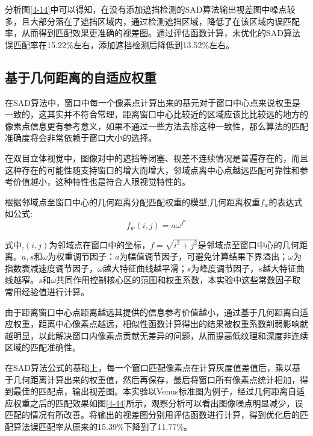 分析图\ref{4-14}中可以得知，在没有添加遮挡检测的SAD算法输出视差图中噪点较多，且大部分落在了遮挡区域内，通过检测遮挡区域，降低了在该区域内误匹配率，从而得到匹配效果更准确的视差图。通过评估函数计算，未优化的SAD算法误匹配率在15.22\%左右，添加遮挡检测后降低到13.52\%左右。

\subsection{基于几何距离的自适应权重}

在SAD算法中，窗口中每一个像素点计算出来的基元对于窗口中心点来说权重是一致的，这其实并不符合常理，距离窗口中心比较近的区域应该比比较远的地方的像素点信息更有参考意义，如果不通过一些方法去除这种一致性，那么算法的匹配准确度将会非常依赖于窗口大小的选择。

在双目立体视觉中，图像对中的遮挡等闭塞、视差不连续情况是普遍存在的，而且这种存在的可能性随支持窗口的增大而增大，邻域点离中心点越远匹配可靠性和参考价值越小，这种特性也是符合人眼视觉特性的。


根据邻域点至窗口中心的几何距离分配匹配权重的模型,几何距离权重$f_{w}$的表达式如公式: 
\begin{equation}
f_{w}(i,j) = a\omega ^{f^{s}}
\end{equation}

式中,$(i,j)$为邻域点在窗口中的坐标，$f=\sqrt{i^{2}+j^{2}}$是邻域点至窗口中心的几何距离。$a,s$和$\omega$为权重调节因子：$a$为幅值调节因子，可避免计算结果下界溢出；$\omega$为指数衰减速度调节因子，$\omega$越大特征曲线越平滑；$s$为峰度调节因子，$s$越大特征曲线越窄。$s$和$\omega$共同作用控制核心区的范围和权重系数，本实验中这些常数因子取常用经验值进行计算。

由于距离窗口中心点距离越远其提供的信息参考价值越小，通过基于几何距离自适应权重，距离中心像素点越远，相似性函数计算得出的结果被权重系数削弱影响就越明显，以此解决窗口内像素点贡献无差异的问题，从而提高低纹理和深度非连续区域的匹配准确性。

在SAD算法公式的基础上，每一个窗口匹配像素点在计算灰度值差值后，乘以基于几何距离计算出来的权重值，然后再保存，最后将窗口所有像素点统计相加，得到最佳的匹配点，输出视差图。本实验以Venus标准图为例子，经过几何距离自适应权重之后的匹配效果如图\ref{4-44}所示，观察分析可以看出图像噪点明显减少，误匹配的情况有所改善。将输出的视差图分别用评估函数进行计算，得到优化后的匹配算法误匹配率从原来的15.39\%下降到了11.77\%。


